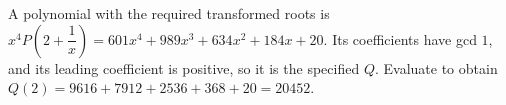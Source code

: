 A polynomial with the required transformed roots is $x^4P\left(2+\dfrac{1}{x}\right)=601x^4+989x^3+634x^2+184x+20$. Its coefficients have gcd $1$, and its leading coefficient is positive, so it is the specified $Q$. Evaluate to obtain $Q(2)=9616+7912+2536+368+20=\boxed{20452}$.
